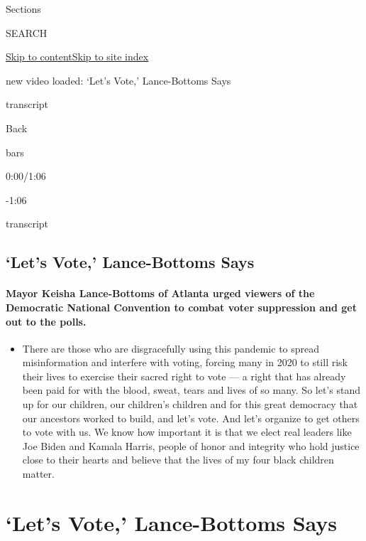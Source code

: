 Sections

SEARCH

\protect\hyperlink{site-content}{Skip to
content}\protect\hyperlink{site-index}{Skip to site index}

new video loaded: `Let's Vote,' Lance-Bottoms Says

transcript

Back

bars

0:00/1:06

-1:06

transcript

\hypertarget{lets-vote-lance-bottoms-says}{%
\subsection{`Let's Vote,' Lance-Bottoms
Says}\label{lets-vote-lance-bottoms-says}}

\hypertarget{mayor-keisha-lance-bottoms-of-atlanta-urged-viewers-of-the-democratic-national-convention-to-combat-voter-suppression-and-get-out-to-the-polls}{%
\paragraph{Mayor Keisha Lance-Bottoms of Atlanta urged viewers of the
Democratic National Convention to combat voter suppression and get out
to the
polls.}\label{mayor-keisha-lance-bottoms-of-atlanta-urged-viewers-of-the-democratic-national-convention-to-combat-voter-suppression-and-get-out-to-the-polls}}

\begin{itemize}
\tightlist
\item
  There are those who are disgracefully using this pandemic to spread
  misinformation and interfere with voting, forcing many in 2020 to
  still risk their lives to exercise their sacred right to vote --- a
  right that has already been paid for with the blood, sweat, tears and
  lives of so many. So let's stand up for our children, our children's
  children and for this great democracy that our ancestors worked to
  build, and let's vote. And let's organize to get others to vote with
  us. We know how important it is that we elect real leaders like Joe
  Biden and Kamala Harris, people of honor and integrity who hold
  justice close to their hearts and believe that the lives of my four
  black children matter.
\end{itemize}

\hypertarget{lets-vote-lance-bottoms-says-1}{%
\section{`Let's Vote,' Lance-Bottoms
Says}\label{lets-vote-lance-bottoms-says-1}}

